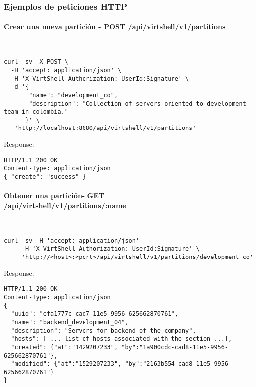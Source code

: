 \subsubsection{Ejemplos de peticiones HTTP}

\paragraph{Crear una nueva partición - POST /api/virtshell/v1/partitions} ~\\

\begin{lstlisting}[style=json]
curl -sv -X POST \
  -H 'accept: application/json' \
  -H 'X-VirtShell-Authorization: UserId:Signature' \
  -d '{
       "name": "development_co",
       "description": "Collection of servers oriented to development team in colombia."
      }' \
   'http://localhost:8080/api/virtshell/v1/partitions'
\end{lstlisting}

Response:

\begin{lstlisting}[style=json]
HTTP/1.1 200 OK
Content-Type: application/json
{ "create": "success" }
\end{lstlisting}

\paragraph{Obtener una partición- GET \\/api/virtshell/v1/partitions/:name} ~\\

\begin{lstlisting}[style=json]
curl -sv -H 'accept: application/json' 
     -H 'X-VirtShell-Authorization: UserId:Signature' \ 
     'http://<host>:<port>/api/virtshell/v1/partitions/development_co'
\end{lstlisting}

Response:

\begin{lstlisting}[style=json]
HTTP/1.1 200 OK
Content-Type: application/json
{
  "uuid": "efa1777c-cad7-11e5-9956-625662870761",
  "name": "backend_development_04",
  "description": "Servers for backend of the company", 
  "hosts": [ ... list of hosts associated with the section ...],  
  "created": {"at":"1429207233", "by":"1a900cdc-cad8-11e5-9956-625662870761"},
  "modified": {"at":"1529207233", "by":"2163b554-cad8-11e5-9956-625662870761"}
}
\end{lstlisting}

